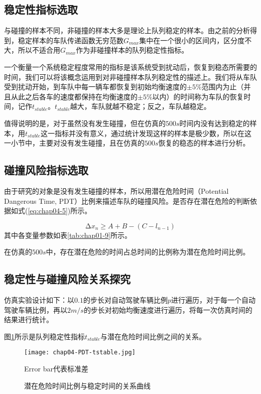 \subsection{稳定性指标选取}

 与碰撞的样本不同，非碰撞的样本大多是理论上队列稳定的样本。由之前的分析得到，稳定样本的车队传递函数无穷范数$G_{max}$集中在一个很小的区间内，区分度不大，所以不适合用$G_{max}$作为非碰撞样本的队列稳定性指标。

 一个衡量一个系统稳定程度常用的指标是该系统受到扰动后，恢复到稳态所需要的时间，我们可以将该概念运用到对非碰撞样本队列稳定性的描述上。我们将从车队受到扰动开始，到车队中每一辆车都恢复到初始均衡速度的$\pm 5\%$范围内为止（并且从此之后各车的速度都保持在均衡速度的$\pm 5\%$以内）的时间称为车队的恢复时间，记作$t_{stable}$。$t_{stable}$越大，车队就越不稳定；反之，车队越稳定。

 值得说明的是，对于虽然没有发生碰撞，但在仿真的$500s$时间内没有达到稳定的样本，用$t_{stable}$这一指标并没有意义，通过统计发现这样的样本是极少数，所以在这一小节中，主要对没有发生碰撞，且在仿真的$500s$恢复的稳态的样本进行分析。

\subsection{碰撞风险指标选取}

由于研究的对象是没有发生碰撞的样本，所以用潜在危险时间（Potential Dangerous Time, PDT）比例来描述车队的碰撞风险。是否存在潜在危险的判断依据如式(\ref{eq:chap04-5})所示。

\begin{equation}
    \increment{x_n} \geqslant A + B - (C - l_{n-1})
    \label{eq:chap04-5}
\end{equation}
其中各变量参数如表\ref{tab:chap01-9}所示。

在仿真的$500s$中，存在潜在危险的时间占总时间的比例称为潜在危险时间比例。

\subsection{稳定性与碰撞风险关系探究}

仿真实验设计如下：以$0.1$的步长对自动驾驶车辆比例$p$进行遍历，对于每一个自动驾驶车辆比例，再以$2m/s$的步长对初始均衡速度进行遍历，将每一次仿真时间的结果进行统计。

图\ref{fig:chap04-8}所示是队列稳定性指标$t_{stable}$与潜在危险时间比例之间的关系。

\begin{figure}
    \centering
    \texttt{[image: chap04-PDT-tstable.jpg]}
    \caption*{Error bar代表标准差}
    \caption{潜在危险时间比例与稳定时间的关系曲线}
    \label{fig:chap04-8}
\end{figure} 

